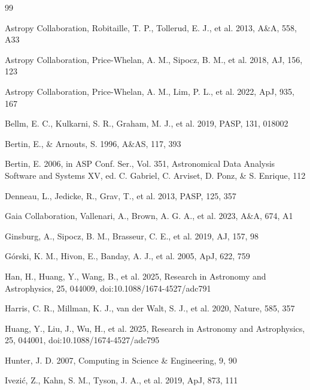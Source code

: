 \documentclass[referee]{raa}
\begin{document}
\begin{thebibliography}{99}

Astropy Collaboration, Robitaille, T. P., Tollerud, E. J., et al. 2013, A\&A, 558, A33

Astropy Collaboration, Price-Whelan, A. M., Sipocz, B. M., et al. 2018, AJ, 156, 123

Astropy Collaboration, Price-Whelan, A. M., Lim, P. L., et al. 2022, ApJ, 935, 167

Bellm, E. C., Kulkarni, S. R., Graham, M. J., et al. 2019, PASP, 131, 018002

Bertin, E., \& Arnouts, S. 1996, A\&AS, 117, 393

Bertin, E. 2006, in ASP Conf. Ser., Vol. 351, Astronomical Data Analysis Software and Systems XV, ed. C. Gabriel, C. Arviset, D. Ponz, \& S. Enrique, 112

Denneau, L., Jedicke, R., Grav, T., et al. 2013, PASP, 125, 357

Gaia Collaboration, Vallenari, A., Brown, A. G. A., et al. 2023, A\&A, 674, A1

Ginsburg, A., Sipocz, B. M., Brasseur, C. E., et al. 2019, AJ, 157, 98

G\'orski, K. M., Hivon, E., Banday, A. J., et al. 2005, ApJ, 622, 759

Han, H., Huang, Y., Wang, B., et al. 2025, Research in Astronomy and Astrophysics, 25, 044009, doi:10.1088/1674-4527/adc791

Harris, C. R., Millman, K. J., van der Walt, S. J., et al. 2020, Nature, 585, 357

Huang, Y., Liu, J., Wu, H., et al. 2025, Research in Astronomy and Astrophysics, 25, 044001, doi:10.1088/1674-4527/adc795

Hunter, J. D. 2007, Computing in Science \& Engineering, 9, 90

Ivezi\'c, Z., Kahn, S. M., Tyson, J. A., et al. 2019, ApJ, 873, 111


\end{thebibliography}
\end{document}
